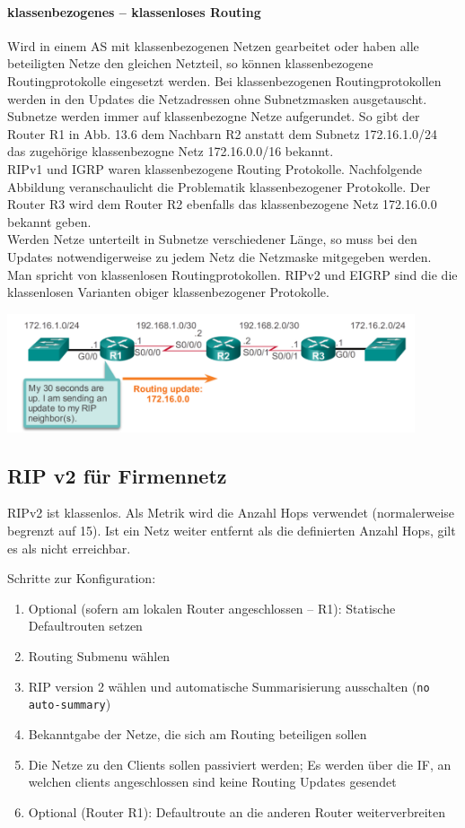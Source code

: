 \documentclass[a4paper,12pt]{article}
\begin{document}
\paragraph{klassenbezogenes -- klassenloses Routing}
Wird in einem AS mit klassenbezogenen Netzen gearbeitet oder haben alle beteiligten Netze den gleichen Netzteil, so können klassenbezogene Routingprotokolle eingesetzt werden. Bei klassenbezogenen Routingprotokollen werden in den Updates die Netzadressen ohne Subnetzmasken ausgetauscht. Subnetze werden immer auf klassenbezogne Netze aufgerundet. So gibt der Router R1 in Abb. 13.6 dem Nachbarn R2 anstatt dem Subnetz 172.16.1.0/24 das zugehörige klassenbezogne Netz 172.16.0.0/16 bekannt.\\

RIPv1 und IGRP waren klassenbezogene Routing Protokolle. Nachfolgende Abbildung veranschaulicht die Problematik klassenbezogener Protokolle. Der Router R3 wird dem Router R2 ebenfalls das klassenbezogene Netz 172.16.0.0 bekannt geben.\\

Werden Netze unterteilt in Subnetze verschiedener Länge, so muss bei den Updates notwendigerweise zu jedem Netz die Netzmaske mitgegeben werden. Man spricht von klassenlosen Routingprotokollen. RIPv2 und EIGRP sind die die klassenlosen Varianten obiger klassenbezogener Protokolle.

\begin{center}
\includegraphics[width=12cm]{img/13_classless.png}
\end{center}


\subsection{RIP v2 für Firmennetz}
RIPv2 ist klassenlos. Als Metrik wird die Anzahl Hops verwendet (normalerweise begrenzt auf 15). Ist ein Netz weiter entfernt als die definierten Anzahl Hops, gilt es als nicht erreichbar.

Schritte zur Konfiguration:
\begin{enumerate}
\item Optional (sofern am lokalen Router angeschlossen -- R1): Statische Defaultrouten setzen
\item Routing Submenu wählen
\item RIP version 2 wählen und automatische Summarisierung ausschalten (\verb+no auto-summary+)
\item Bekanntgabe der Netze, die sich am Routing beteiligen sollen
\item Die Netze zu den Clients sollen passiviert werden; Es werden über die IF, an welchen clients angeschlossen sind keine Routing Updates gesendet
\item Optional (Router R1): Defaultroute an die anderen Router weiterverbreiten
\end{enumerate}
\end{document}
